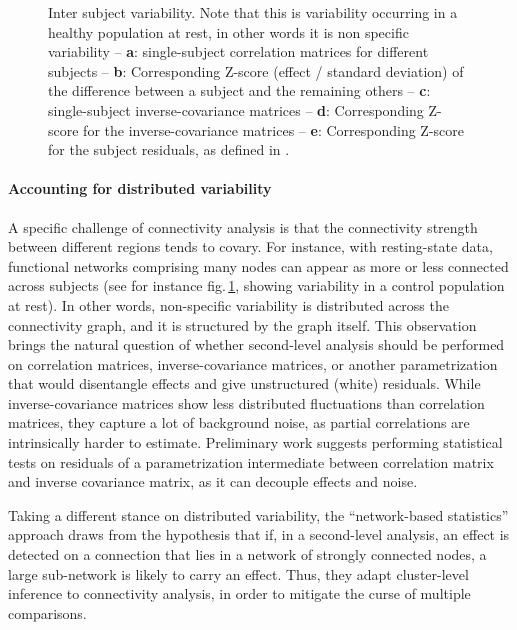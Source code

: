 \documentclass[5p]{elsarticle}
\begin{document}
\begin{figure}
\caption{Inter subject variability. Note that this is variability
occurring in a healthy population at rest, in other words it is non specific
variability -- \textbf{a}: single-subject
correlation matrices for different subjects -- \textbf{b}:
Corresponding Z-score (effect / standard deviation) of the difference
between a subject and the remaining others -- \textbf{c}:
single-subject inverse-covariance matrices -- \textbf{d}: Corresponding Z-score
for the inverse-covariance matrices -- \textbf{e}:
Corresponding Z-score for the subject residuals, as defined in 
\cite{varoquaux2010b}.
\label{fig:inter_subject}}
\end{figure}

\paragraph{Accounting for distributed variability}
%
A specific challenge of connectivity analysis is that the connectivity
strength between different regions tends to covary. For instance, with
resting-state data, functional networks comprising many nodes can appear
as more or less connected across subjects (see for instance
fig.\,\ref{fig:inter_subject}, showing variability in a control
population at rest). In other words, non-specific variability is
distributed across the connectivity graph, and it is structured by the
graph itself. This observation brings the natural question of whether
second-level analysis should be performed on correlation matrices,
inverse-covariance matrices, or another parametrization that would
disentangle effects and give unstructured (white) residuals. While
inverse-covariance matrices show less distributed fluctuations than
correlation matrices, they capture a lot of background noise, as partial
correlations are intrinsically harder to estimate. Preliminary work
\cite{varoquaux2010b} suggests performing statistical tests on residuals of
a parametrization intermediate between correlation matrix and inverse
covariance matrix, as it can decouple effects and noise.

Taking a different stance on distributed variability, the ``network-based
statistics'' approach \cite{zalesky2010} draws from the hypothesis that
if, in a second-level analysis, an effect is detected on a connection
that lies in a network of strongly connected nodes, a large
sub-network is
likely to carry an effect. Thus, they adapt cluster-level inference to
connectivity analysis, in order to mitigate the curse of multiple
comparisons.
\end{document}
